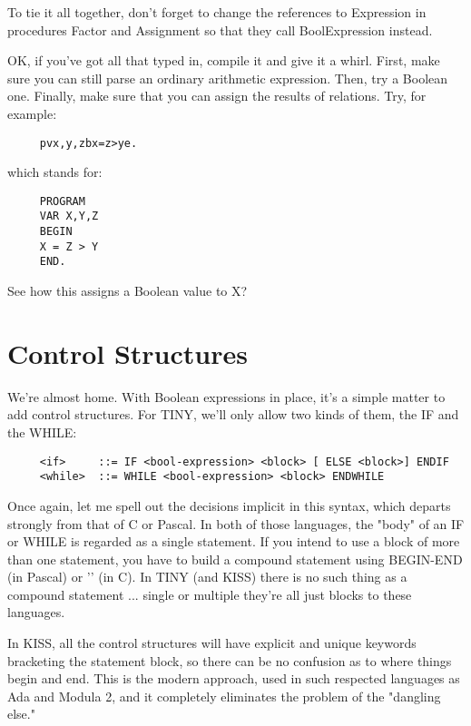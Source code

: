 To tie it all together, don't forget to change the  references to Expression in  procedures Factor and Assignment so that they call BoolExpression instead.

OK, if  you've  got  all  that typed in, compile it and give it a whirl. First, make  sure  you  can  still parse  an  ordinary arithmetic expression. Then, try a Boolean one. Finally, make sure  that you can assign the results of  relations. Try, for example:

\begin{verbatim}
     pvx,y,zbx=z>ye.
\end{verbatim}

which stands for:

\begin{verbatim}
     PROGRAM
     VAR X,Y,Z
     BEGIN
     X = Z > Y
     END.
\end{verbatim}

See how this assigns a Boolean value to X?

\section{Control Structures}

We're almost home. With  Boolean  expressions  in place, it's a simple  matter  to  add control structures. For TINY, we'll only allow two kinds of them, the IF and the WHILE:

{\small
\begin{verbatim}
     <if>     ::= IF <bool-expression> <block> [ ELSE <block>] ENDIF
     <while>  ::= WHILE <bool-expression> <block> ENDWHILE
\end{verbatim} }

Once  again, let  me  spell  out the decisions implicit in  this syntax, which departs strongly from that of C or Pascal. In both of those languages, the "body" of an IF or WHILE is regarded as a single  statement. If you intend to use a block of more than one statement, you have to build a compound statement using BEGIN-END (in Pascal) or  '{}' (in C). In TINY (and KISS) there is no such thing as a compound statement  ... single or multiple they're all just blocks to these languages.

In KISS, all the control structures will have explicit and unique keywords  bracketing  the  statement block, so there  can  be  no confusion as to where things begin  and  end. This is the modern approach, used in such respected languages as Ada  and  Modula 2, and it completely eliminates the problem of the "dangling else."

